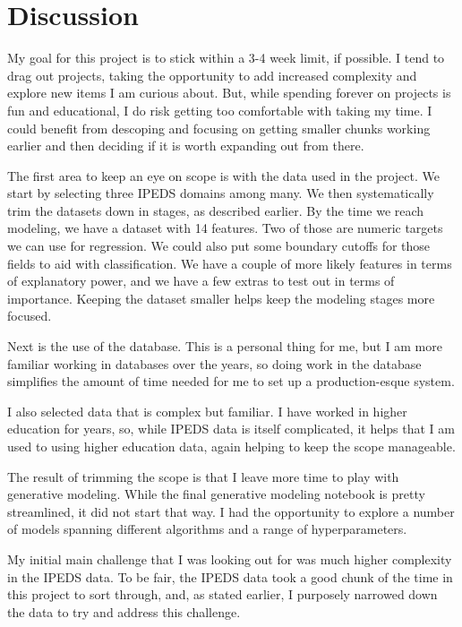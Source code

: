 \documentclass[sigconf, authorversion, nonacm]{acmart}
\begin{document}
\section{Discussion}
    My goal for this project is to stick within a 3-4 week limit, if possible. I tend to drag out projects, taking the opportunity to add increased complexity and explore new items I am curious about. But, while spending forever on projects is fun and educational, I do risk getting too comfortable with taking my time. I could benefit from descoping and focusing on getting smaller chunks working earlier and then deciding if it is worth expanding out from there.

    The first area to keep an eye on scope is with the data used in the project. We start by selecting three IPEDS domains among many. We then systematically trim the datasets down in stages, as described earlier. By the time we reach modeling, we have a dataset with 14 features. Two of those are numeric targets we can use for regression. We could also put some boundary cutoffs for those fields to aid with classification. We have a couple of more likely features in terms of explanatory power, and we have a few extras to test out in terms of importance. Keeping the dataset smaller helps keep the modeling stages more focused.

    Next is the use of the database. This is a personal thing for me, but I am more familiar working in databases over the years, so doing work in the database simplifies the amount of time needed for me to set up a production-esque system.

    I also selected data that is complex but familiar. I have worked in higher education for years, so, while IPEDS data is itself complicated, it helps that I am used to using higher education data, again helping to keep the scope manageable.

    The result of trimming the scope is that I leave more time to play with generative modeling. While the final generative modeling notebook is pretty streamlined, it did not start that way. I had the opportunity to explore a number of models spanning different algorithms and a range of hyperparameters.

    My initial main challenge that I was looking out for was much higher complexity in the IPEDS data. To be fair, the IPEDS data took a good chunk of the time in this project to sort through, and, as stated earlier, I purposely narrowed down the data to try and address this challenge.
\end{document}
